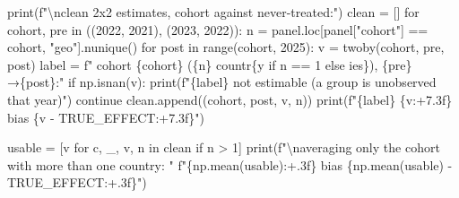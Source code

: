 \documentclass[
  letterpaper,
  10pt,
  twoside,
  openright,
  numbers=noenddot,
  chapterprefix=true]{scrbook}
\newenvironment{Shaded}{}{}
\newcommand{\BuiltInTok}[1]{\textcolor[rgb]{0.84,0.23,0.29}{#1}}
\newcommand{\CharTok}[1]{\textcolor[rgb]{0.01,0.18,0.38}{#1}}
\newcommand{\ControlFlowTok}[1]{\textcolor[rgb]{0.84,0.23,0.29}{#1}}
\newcommand{\DecValTok}[1]{\textcolor[rgb]{0.00,0.36,0.77}{#1}}
\newcommand{\KeywordTok}[1]{\textcolor[rgb]{0.84,0.23,0.29}{#1}}
\newcommand{\NormalTok}[1]{\textcolor[rgb]{0.14,0.16,0.18}{#1}}
\newcommand{\OperatorTok}[1]{\textcolor[rgb]{0.14,0.16,0.18}{#1}}
\newcommand{\SpecialCharTok}[1]{\textcolor[rgb]{0.00,0.36,0.77}{#1}}
\newcommand{\SpecialStringTok}[1]{\textcolor[rgb]{0.01,0.18,0.38}{#1}}
\newcommand{\StringTok}[1]{\textcolor[rgb]{0.01,0.18,0.38}{#1}}
\begin{document}
\begin{Shaded}
\begin{Highlighting}[]
\BuiltInTok{print}\NormalTok{(}\SpecialStringTok{f"}\CharTok{\textbackslash{}n}\SpecialStringTok{clean 2x2 estimates, cohort against never{-}treated:"}\NormalTok{)}
\NormalTok{clean }\OperatorTok{=}\NormalTok{ []}
\ControlFlowTok{for}\NormalTok{ cohort, pre }\KeywordTok{in}\NormalTok{ ((}\DecValTok{2022}\NormalTok{, }\DecValTok{2021}\NormalTok{), (}\DecValTok{2023}\NormalTok{, }\DecValTok{2022}\NormalTok{)):}
\NormalTok{    n }\OperatorTok{=}\NormalTok{ panel.loc[panel[}\StringTok{"cohort"}\NormalTok{] }\OperatorTok{==}\NormalTok{ cohort, }\StringTok{"geo"}\NormalTok{].nunique()}
    \ControlFlowTok{for}\NormalTok{ post }\KeywordTok{in} \BuiltInTok{range}\NormalTok{(cohort, }\DecValTok{2025}\NormalTok{):}
\NormalTok{        v }\OperatorTok{=}\NormalTok{ twoby(cohort, pre, post)}
\NormalTok{        label }\OperatorTok{=} \SpecialStringTok{f"   cohort }\SpecialCharTok{\{}\NormalTok{cohort}\SpecialCharTok{\}}\SpecialStringTok{ (}\SpecialCharTok{\{}\NormalTok{n}\SpecialCharTok{\}}\SpecialStringTok{ countr}\SpecialCharTok{\{}\StringTok{\textquotesingle{}y\textquotesingle{}} \ControlFlowTok{if}\NormalTok{ n }\OperatorTok{==} \DecValTok{1} \ControlFlowTok{else} \StringTok{\textquotesingle{}ies\textquotesingle{}}\SpecialCharTok{\}}\SpecialStringTok{), }\SpecialCharTok{\{}\NormalTok{pre}\SpecialCharTok{\}}\SpecialStringTok{→}\SpecialCharTok{\{}\NormalTok{post}\SpecialCharTok{\}}\SpecialStringTok{:"}
        \ControlFlowTok{if}\NormalTok{ np.isnan(v):}
            \BuiltInTok{print}\NormalTok{(}\SpecialStringTok{f"}\SpecialCharTok{\{}\NormalTok{label}\SpecialCharTok{\}}\SpecialStringTok{ not estimable (a group is unobserved that year)"}\NormalTok{)}
            \ControlFlowTok{continue}
\NormalTok{        clean.append((cohort, post, v, n))}
        \BuiltInTok{print}\NormalTok{(}\SpecialStringTok{f"}\SpecialCharTok{\{}\NormalTok{label}\SpecialCharTok{\}}\SpecialStringTok{ }\SpecialCharTok{\{}\NormalTok{v}\SpecialCharTok{:+7.3f\}}\SpecialStringTok{   bias }\SpecialCharTok{\{}\NormalTok{v }\OperatorTok{{-}}\NormalTok{ TRUE\_EFFECT}\SpecialCharTok{:+7.3f\}}\SpecialStringTok{"}\NormalTok{)}

\NormalTok{usable }\OperatorTok{=}\NormalTok{ [v }\ControlFlowTok{for}\NormalTok{ c, \_, v, n }\KeywordTok{in}\NormalTok{ clean }\ControlFlowTok{if}\NormalTok{ n }\OperatorTok{\textgreater{}} \DecValTok{1}\NormalTok{]}
\BuiltInTok{print}\NormalTok{(}\SpecialStringTok{f"}\CharTok{\textbackslash{}n}\SpecialStringTok{averaging only the cohort with more than one country: "}
      \SpecialStringTok{f"}\SpecialCharTok{\{}\NormalTok{np}\SpecialCharTok{.}\NormalTok{mean(usable)}\SpecialCharTok{:+.3f\}}\SpecialStringTok{   bias }\SpecialCharTok{\{}\NormalTok{np}\SpecialCharTok{.}\NormalTok{mean(usable) }\OperatorTok{{-}}\NormalTok{ TRUE\_EFFECT}\SpecialCharTok{:+.3f\}}\SpecialStringTok{"}\NormalTok{)}
\end{Highlighting}
\end{Shaded}
\end{document}
